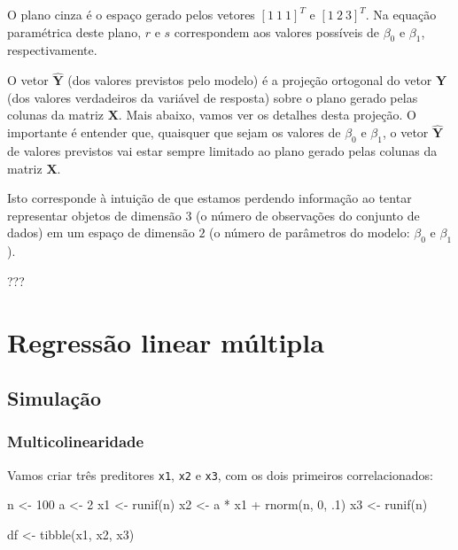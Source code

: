 \documentclass[
  letterpaper,
  DIV=11,
  numbers=noendperiod]{scrreprt}
\newenvironment{Shaded}{\begin{snugshade}}{\end{snugshade}}
\newcommand{\DecValTok}[1]{\textcolor[rgb]{0.68,0.00,0.00}{#1}}
\newcommand{\FunctionTok}[1]{\textcolor[rgb]{0.28,0.35,0.67}{#1}}
\newcommand{\NormalTok}[1]{\textcolor[rgb]{0.00,0.23,0.31}{#1}}
\newcommand{\OtherTok}[1]{\textcolor[rgb]{0.00,0.23,0.31}{#1}}
\newcommand{\SpecialCharTok}[1]{\textcolor[rgb]{0.37,0.37,0.37}{#1}}
\begin{document}
O plano cinza é o espaço gerado pelos vetores $[1\ 1\ 1]^T$ e
$[1\ 2\ 3]^T$. Na equação paramétrica deste plano, $r$ e $s$
correspondem aos valores possíveis de $\beta_0$ e $\beta_1$,
respectivamente.

O vetor $\mathbf{\widehat{Y}}$ (dos valores previstos pelo modelo) é a
projeção ortogonal do vetor $\mathbf{Y}$ (dos valores verdadeiros da
variável de resposta) sobre o plano gerado pelas colunas da matriz
$\mathbf{X}$. Mais abaixo, vamos ver os detalhes desta projeção. O
importante é entender que, quaisquer que sejam os valores de $\beta_0$ e
$\beta_1$, o vetor $\mathbf{\widehat{Y}}$ de valores previstos vai estar
sempre limitado ao plano gerado pelas colunas da matriz $\mathbf{X}$.

Isto corresponde à intuição de que estamos perdendo informação ao tentar
representar objetos de dimensão $3$ (o número de observações do conjunto
de dados) em um espaço de dimensão $2$ (o número de parâmetros do
modelo: $\beta_0$ e $\beta_1$).

???


\chapter{Regressão linear
múltipla}\label{regressuxe3o-linear-muxfaltipla}

\section{Simulação}\label{simulauxe7uxe3o}

\subsection{Multicolinearidade}\label{multicolinearidade}

Vamos criar três preditores \texttt{x1}, \texttt{x2} e \texttt{x3}, com
os dois primeiros correlacionados:

\begin{Shaded}
\begin{Highlighting}[]
\NormalTok{n }\OtherTok{\textless{}{-}} \DecValTok{100}
\NormalTok{a }\OtherTok{\textless{}{-}} \DecValTok{2}
\NormalTok{x1 }\OtherTok{\textless{}{-}} \FunctionTok{runif}\NormalTok{(n)}
\NormalTok{x2 }\OtherTok{\textless{}{-}}\NormalTok{ a }\SpecialCharTok{*}\NormalTok{ x1 }\SpecialCharTok{+} \FunctionTok{rnorm}\NormalTok{(n, }\DecValTok{0}\NormalTok{, .}\DecValTok{1}\NormalTok{)}
\NormalTok{x3 }\OtherTok{\textless{}{-}} \FunctionTok{runif}\NormalTok{(n)}

\NormalTok{df }\OtherTok{\textless{}{-}} \FunctionTok{tibble}\NormalTok{(x1, x2, x3)}
\end{Highlighting}
\end{Shaded}
\end{document}
